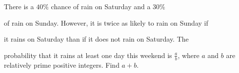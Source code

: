There is a $40\%$ chance of rain on Saturday and a $30\%$

 of rain on Sunday. However, it is twice as likely to rain on Sunday if 

it rains on Saturday than if it does not rain on Saturday. The 

probability that it rains at least one day this weekend is $\frac{a}{b}$,  where $a$ and $b$ are relatively prime positive integers. Find $a+b$.
